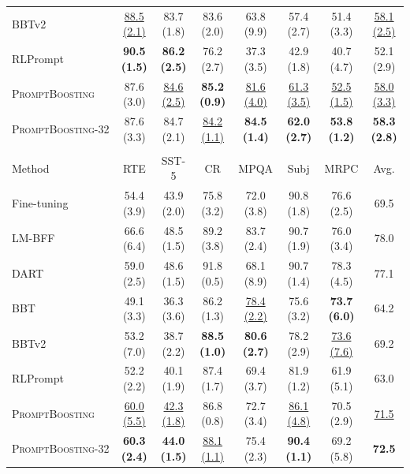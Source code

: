 \documentclass{article}
\theoremstyle{plain}
\theoremstyle{definition}
\theoremstyle{remark}
\newcommand{\alg}{\textsc{PromptBoosting}}
\begin{document}
\begin{table}[h]
{\begin{tabular}{l|ccccccc}
         BBTv2& \underline{88.5 (2.1)} & 83.7 (1.8) & 83.6 (2.0) & 63.8 (9.9) & 57.4 (2.7) & 51.4 (3.3) & \underline{58.1 (2.5)}  \\
         RLPrompt & \textbf{90.5 (1.5)} & \textbf{86.2 (2.5)} & 76.2 (2.7)& 37.3 (3.5)& 42.9 (1.8) & 40.7 (4.7)& 52.1 (2.9) \\
\rowcolor{Gray}
         {\alg} & 87.6 (3.0) & \underline{84.6 (2.5)} & \textbf{85.2 (0.9)} & \underline{81.6 (4.0)} & \underline{61.3 (3.5)}& \underline{52.5 (1.5)} & \underline{58.0 (3.3)} \\
\rowcolor{Gray}
         {\alg}-32 & 87.6 (3.3) & 84.7 (2.1) & \underline{84.2 (1.1)} & \textbf{84.5 (1.4)} &  \textbf{62.0 (2.7)} & \textbf{53.8 (1.2)} & \textbf{58.3 (2.8)} \\
    \midrule
    & & &  & & & &  \\
    \midrule
         Method & RTE & SST-5 & CR & MPQA & Subj  & MRPC &  Avg.  \\
    \midrule
         Fine-tuning& 54.4 (3.9) & 43.9 (2.0) & 75.8 (3.2) & 72.0 (3.8) & 90.8 (1.8) & 76.6 (2.5) & 69.5\\
         LM-BFF& 66.6 (6.4) & 48.5 (1.5) & 89.2 (3.8) & 83.7 (2.4) & 90.7 (1.9) & 76.0 (3.4) & 78.0 \\
         DART& 59.0 (2.5) & 48.6 (1.5) &  91.8 (0.5) & 68.1 (8.9) & 90.7 (1.4) & 78.3 (4.5) & 77.1\\
         \midrule
         BBT & 49.1 (3.3) & 36.3 (3.6) & 86.2 (1.3) & \underline{78.4 (2.2)} & 75.6 (3.2) & \textbf{73.7 (6.0)} & 64.2 \\
         BBTv2 & 53.2 (7.0) & 38.7 (2.2) & \textbf{88.5 (1.0)} & \textbf{80.6 (2.7)} & 78.2 (2.9) & \underline{73.6 (7.6)} & 69.2  \\
         RLPrompt & 52.2 (2.2) & 40.1 (1.9) & 87.4 (1.7) & 69.4 (3.7) & 81.9 (1.2) & 61.9 (5.1) & 63.0 \\
\rowcolor{Gray}
         {\alg}& \underline{60.0 (5.5)} & \underline{42.3 (1.8)} & 86.8 (0.8) & 72.7 (3.4) & \underline{86.1 (4.8)} & 70.5 (2.9) & \underline{71.5} \\
\rowcolor{Gray}
         {\alg}-32 & \textbf{60.3 (2.4)} & \textbf{44.0 (1.5)} & \underline{88.1 (1.1)} & 75.4 (2.3) & \textbf{90.4 (1.1)} & 69.2 (5.8) & \textbf{72.5}\\
    \bottomrule[1pt]
    \end{tabular}
    }
\end{table}
\end{document}

